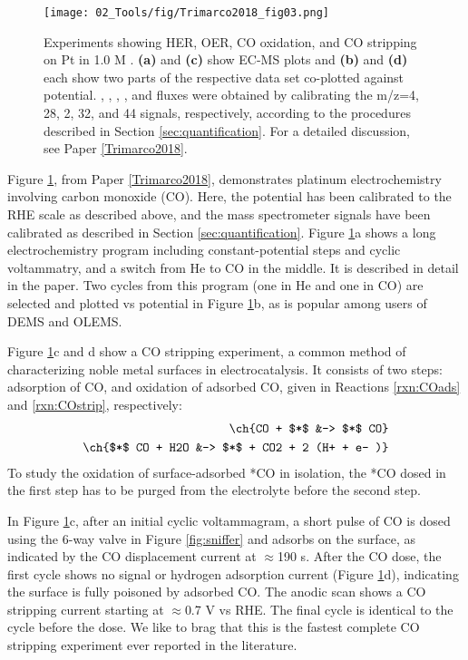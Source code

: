 \begin{figure}[h!]
	\centering
	\texttt{[image: 02\_Tools/fig/Trimarco2018\_fig03.png]}
	\caption{Experiments showing HER, OER, CO oxidation, and CO stripping on Pt in 1.0 M .  \textbf{(a)} and \textbf{(c)} show EC-MS plots and \textbf{(b)} and \textbf{(d)} each show two parts of the respective data set co-plotted against potential. , , , , and  fluxes were obtained by calibrating the m/z=4, 28, 2, 32, and 44 signals, respectively, according to the procedures described in Section \ref{sec:quantification}. For a detailed discussion, see Paper \ref{Trimarco2018}.}
	\label{fig:fig3}
\end{figure}

Figure \ref{fig:fig3}, from Paper \ref{Trimarco2018}, demonstrates platinum electrochemistry involving carbon monoxide (CO). Here, the potential has been calibrated to the RHE scale as described above, and the mass spectrometer signals have been calibrated as described in Section \ref{sec:quantification}. Figure \ref{fig:fig3}a shows a long electrochemistry program including constant-potential steps and cyclic voltammatry, and a switch from He to CO in the middle. It is described in detail in the paper. Two cycles from this program (one in He and one in CO) are selected and plotted vs potential in Figure \ref{fig:fig3}b, as is popular among users of DEMS and OLEMS.

Figure \ref{fig:fig3}c and d show a CO stripping experiment, a common method of characterizing noble metal surfaces in electrocatalysis\cite{Mayrhofer2005, Koper2009, Ganassin2017, Jensen2017_PhD}. It consists of two steps: adsorption of CO, and oxidation of adsorbed CO, given in Reactions \ref{rxn:COads} and \ref{rxn:COstrip}, respectively:
\begin{align}
\ch{CO + $*$ &-> $*$ CO}\label{rxn:COads}\\
\ch{$*$ CO + H2O &-> $*$ + CO2 + 2 (H+ + e- )}\label{rxn:COstrip}
\end{align}
To study the oxidation of surface-adsorbed *CO in isolation, the *CO dosed in the first step has to be purged from the electrolyte before the second step.

In Figure \ref{fig:fig3}c, after an initial cyclic voltammagram, a short pulse of CO is dosed using the 6-way valve in Figure \ref{fig:sniffer} and adsorbs on the surface, as indicated by the CO displacement current at $\approx$190 s. After the CO dose, the first cycle shows no  signal or hydrogen adsorption current (Figure \ref{fig:fig3}d), indicating the surface is fully poisoned by adsorbed CO. The anodic scan shows a CO stripping current starting at $\approx$0.7 V vs RHE. The final cycle is identical to the cycle before the  dose. We like to brag that this is the fastest complete CO stripping experiment ever reported in the literature.

